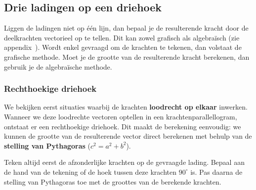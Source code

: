 \documentclass{ximera}
\begin{document}

\subsection{Drie ladingen op een driehoek}
Liggen de ladingen niet op één lijn, dan bepaal je de resulterende kracht door de deelkrachten vectorieel op te tellen. Dit kan zowel grafisch als algebraïsch (zie appendix~). Wordt enkel gevraagd om de krachten te tekenen, dan volstaat de grafische methode. Moet je de grootte van de resulterende kracht berekenen, dan gebruik je de algebraïsche methode.

\subsubsection{Rechthoekige driehoek}
We bekijken eerst situaties waarbij de krachten \textbf{loodrecht op elkaar} inwerken. Wanneer we deze loodrechte vectoren optellen in een krachtenparallellogram, ontstaat er een rechthoekige driehoek. Dit maakt de berekening eenvoudig: we kunnen de grootte van de resulterende vector direct berekenen met behulp van de \textbf{stelling van Pythagoras} ($c^{2} = a^{2} + b^{2}$).

\begin{remark}[title={Stappenplan bij vectoren in 2D}]\nl
Teken altijd eerst de afzonderlijke krachten op de gevraagde lading. Bepaal aan de hand van de tekening of de hoek tussen deze krachten $90^\circ$ is. Pas daarna de stelling van Pythagoras toe met de groottes van de berekende krachten.
\end{remark}
\end{document}

